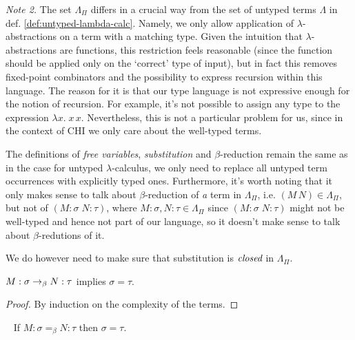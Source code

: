 \emph{Note 2.}
    The set $\Lambda_\Pi$ differs in a crucial way from the set of
    untyped terms $\Lambda$ in def.  \ref{def:untyped-lambda-calc}.
    Namely, we only allow application of $\lambda$-abstractions on a
    term with a matching type.  Given the intuition that
    $\lambda$-abstractions are functions, this restriction feels
    reasonable (since the function should be applied only on the
    `correct' type of input), but in fact this removes fixed-point
    combinators and the possibility to express recursion within this
    language. The reason for it is that our type language is not
    expressive enough for the notion of recursion. For example, it's
    not possible to assign any type to the expression $\lambda x.\; x\,
    x$. Nevertheless, this is not a particular problem for us, since in
    the context of CHI we only care about the well-typed terms.

The definitions of \emph{free variables}, \emph{substitution} and
$\beta$-reduction remain the same as in the case for untyped
$\lambda$-calculus, we only need to replace all untyped term occurrences with
explicitly typed ones. Furthermore, it's worth noting that it only makes sense
to talk about $\beta$-reduction of \emph{a} term in $\Lambda_\Pi$, i.e. $(M\,
N) \in \Lambda_\Pi$, but not of $(M\!:\!\sigma\; N\!:\!\tau)$, where $M:\sigma, N:\tau
\in \Lambda_\Pi$ since $(M\!:\!\sigma\; N\!:\!\tau)$ might not be well-typed and
hence not part of our language, so it doesn't make sense to talk about
$\beta$-redutions of it.

We do however need to make sure that substitution is $\emph{closed}$ in
$\Lambda_\Pi$.

\begin{proposition}
    $M:\sigma \rightarrow_\beta N:\tau$ implies $\sigma = \tau$.
\end{proposition}
\begin{proof}
    By induction on the complexity of the terms.
\end{proof}

\begin{corollary} {\ }
\label{cor:uniquenessoftypes}
    If $M:\sigma =_\beta N:\tau$ then $\sigma = \tau$.
\end{corollary}

